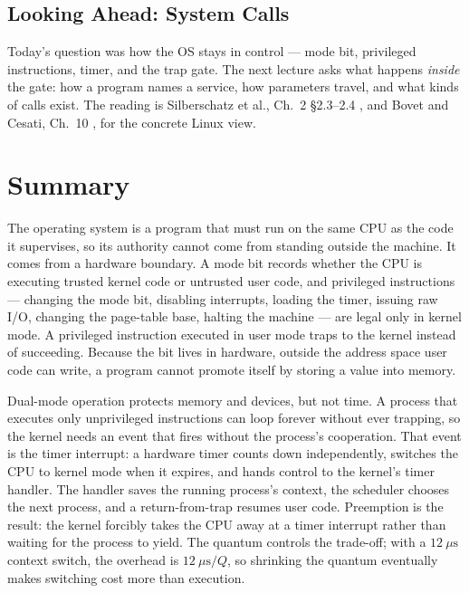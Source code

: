 \documentclass[11pt]{article}
\begin{document}
\subsection{Looking Ahead: System Calls}

Today's question was how the OS stays in control --- mode bit, privileged
instructions, timer, and the trap gate. The next lecture asks what happens
\emph{inside} the gate: how a program names a service, how parameters travel,
and what kinds of calls exist. The reading is Silberschatz et al., Ch.~2
\S2.3--2.4 \cite{SilberschatzOSC_operating_system_concepts}, and Bovet and
Cesati, Ch.~10 \cite{BovetCesati_understanding_linux_kernel}, for the concrete
Linux view.

\section{Summary}

The operating system is a program that must run on the same CPU as the code it
supervises, so its authority cannot come from standing outside the machine. It
comes from a hardware boundary. A mode bit records whether the CPU is executing
trusted kernel code or untrusted user code, and privileged instructions ---
changing the mode bit, disabling interrupts, loading the timer, issuing raw
I/O, changing the page-table base, halting the machine --- are legal only in
kernel mode. A privileged instruction executed in user mode traps to the kernel
instead of succeeding. Because the bit lives in hardware, outside the address
space user code can write, a program cannot promote itself by storing a value
into memory.

Dual-mode operation protects memory and devices, but not time. A process that
executes only unprivileged instructions can loop forever without ever trapping,
so the kernel needs an event that fires without the process's cooperation. That
event is the timer interrupt: a hardware timer counts down independently,
switches the CPU to kernel mode when it expires, and hands control to the
kernel's timer handler. The handler saves the running process's context, the
scheduler chooses the next process, and a return-from-trap resumes user code.
Preemption is the result: the kernel forcibly takes the CPU away at a timer
interrupt rather than waiting for the process to yield. The quantum controls
the trade-off; with a $12\ \mu\text{s}$ context switch, the overhead is
$12\ \mu\text{s}/Q$, so shrinking the quantum eventually makes switching cost
more than execution.
\end{document}
